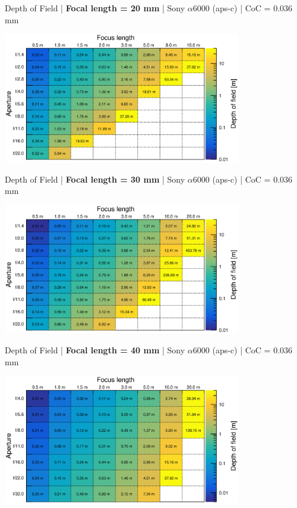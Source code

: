 \documentclass[aspectratio=169]{beamer}
\begin{document}
\begin{frame}[plain]{}
  \vspace{1ex}
  \centering
  Depth of Field | {\bf Focal length = 20 mm} |  Sony $\alpha$\hspace{0.1em}6000 (aps-c) | CoC = 0.036 mm
  
  \includegraphics[center,width=0.78\textwidth]{img/depth-of-field_focl20.eps}
\end{frame}

\begin{frame}[plain]{}
  \vspace{1ex}
  \centering
  Depth of Field | {\bf Focal length = 30 mm} |  Sony $\alpha$\hspace{0.1em}6000 (aps-c) | CoC = 0.036 mm
  
  \includegraphics[center,width=0.78\textwidth]{img/depth-of-field_focl30.eps}
\end{frame}

\begin{frame}[plain]{}
  \vspace{1ex}
  \centering
  Depth of Field | {\bf Focal length = 40 mm} |  Sony $\alpha$\hspace{0.1em}6000 (aps-c) | CoC = 0.036 mm
  
  \includegraphics[center,width=0.78\textwidth]{img/depth-of-field_focl40.eps}
\end{frame}
\end{document}
